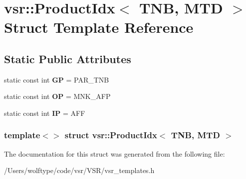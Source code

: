 \hypertarget{structvsr_1_1_product_idx_3_01_t_n_b_00_01_m_t_d_01_4}{\section{vsr\-:\-:Product\-Idx$<$ T\-N\-B, M\-T\-D $>$ Struct Template Reference}
\label{structvsr_1_1_product_idx_3_01_t_n_b_00_01_m_t_d_01_4}
}
\subsection*{Static Public Attributes}
\begin{DoxyCompactItemize}
\item 
\hypertarget{structvsr_1_1_product_idx_3_01_t_n_b_00_01_m_t_d_01_4_a28dc67cb5a86fed689b9431a13e574d8}{static const int {\bfseries G\-P} = P\-A\-R\-\_\-\-T\-N\-B}\label{structvsr_1_1_product_idx_3_01_t_n_b_00_01_m_t_d_01_4_a28dc67cb5a86fed689b9431a13e574d8}

\item 
\hypertarget{structvsr_1_1_product_idx_3_01_t_n_b_00_01_m_t_d_01_4_aab4bca6d0ff8ffc32a08872aa5cfdd14}{static const int {\bfseries O\-P} = M\-N\-K\-\_\-\-A\-F\-P}\label{structvsr_1_1_product_idx_3_01_t_n_b_00_01_m_t_d_01_4_aab4bca6d0ff8ffc32a08872aa5cfdd14}

\item 
\hypertarget{structvsr_1_1_product_idx_3_01_t_n_b_00_01_m_t_d_01_4_af1314567ea6762837f13a84597945012}{static const int {\bfseries I\-P} = A\-F\-F}\label{structvsr_1_1_product_idx_3_01_t_n_b_00_01_m_t_d_01_4_af1314567ea6762837f13a84597945012}

\end{DoxyCompactItemize}
\subsubsection*{template$<$$>$ struct vsr\-::\-Product\-Idx$<$ T\-N\-B, M\-T\-D $>$}



The documentation for this struct was generated from the following file\-:\begin{DoxyCompactItemize}
\item 
/\-Users/wolftype/code/vsr/\-V\-S\-R/vsr\-\_\-templates.\-h\end{DoxyCompactItemize}
